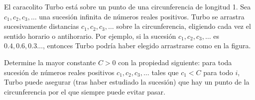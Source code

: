 El caracolito Turbo está sobre un punto de una circunferencia de longitud 1. Sea $c_1,c_2,c_3,\dots$ una sucesión infinita de números reales positivos. Turbo se arrastra sucesivamente distancias $c_1,c_2,c_3,\dots$ sobre la circunferencia, eligiendo cada vez el sentido horario o antihorario. Por ejemplo, si la sucesión $c_1,c_2,c_3,\dots$ es $0.4,0.6,0.3\dots$, entonces Turbo podría haber elegido arrastrarse como en la figura.

Determine la mayor constante $C\gt 0$ con la propiedad siguiente: para toda sucesión de números reales positivos $c_1,c_2,c_3,\dots$ tales que $c_1\lt C$ para todo $i$, Turbo puede asegurar (tras haber estudiado la sucesión) que hay un punto de la circunferencia por el que siempre puede evitar pasar.